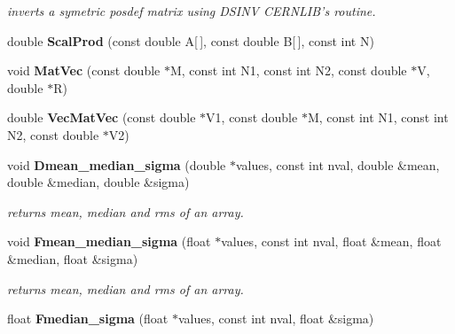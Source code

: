 \begin{CompactItemize}
\begin{CompactList}\small\item\em inverts a symetric posdef matrix using DSINV CERNLIB's routine.\item\end{CompactList}\item 
{}
double {\bf Scal\-Prod} (const double A[$\,$], const double B[$\,$], const int N)\label{vutils_h_a6}

\item 
{}
void {\bf Mat\-Vec} (const double $\ast$M, const int N1, const int N2, const double $\ast$V, double $\ast$R)\label{vutils_h_a7}

\item 
{}
double {\bf Vec\-Mat\-Vec} (const double $\ast$V1, const double $\ast$M, const int N1, const int N2, const double $\ast$V2)\label{vutils_h_a8}

\item 
{}
void {\bf Dmean\_\-median\_\-sigma} (double $\ast$values, const int nval, double \&mean, double \&median, double \&sigma)\label{vutils_h_a9}

\begin{CompactList}\small\item\em returns mean, median and rms of an array.\item\end{CompactList}\item 
{}
void {\bf Fmean\_\-median\_\-sigma} (float $\ast$values, const int nval, float \&mean, float \&median, float \&sigma)\label{vutils_h_a10}

\begin{CompactList}\small\item\em returns mean, median and rms of an array.\item\end{CompactList}\item 
{}
float {\bf Fmedian\_\-sigma} (float $\ast$values, const int nval, float \&sigma)\label{vutils_h_a11}


\end{CompactItemize}
